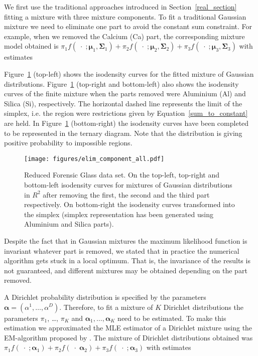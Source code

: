 \documentclass[12pt, a4paper]{article}
\newcommand{\m}[1]{\boldsymbol{#1}}
\theoremstyle{definition}
\begin{document}
We first use the traditional approaches introduced in Section~\ref{real_section} fitting a mixture with three mixture components. To fit a traditional Gaussian mixture we need to eliminate one part to avoid the constant sum constraint. For example, when we removed the Calcium (Ca) part, the corresponding mixture model obtained is
$
\pi_1 f(\;\cdot\; ; \m\mu_1, \m\Sigma_1) + \pi_2 f(\;\cdot\; ; \m\mu_2, \m\Sigma_2) + \pi_3 f(\;\cdot\; ; \m\mu_3, \m\Sigma_3)
$
with estimates

{\small  }


Figure~\ref{fig05component_elimination} (top-left) shows the isodensity curves for the fitted mixture of Gaussian distributions. Figure~\ref{fig05component_elimination} (top-right and bottom-left) also shows the isodensity curves of the finite mixture when the parts removed were Aluminium (Al) and Silica (Si), respectively. The horizontal dashed line represents the limit of the simplex, i.e. the region were restrictions given by Equation~\ref{sum_to_constant} are held. In Figure~\ref{fig05component_elimination} (bottom-right) the isodensity curves have been completed to be represented in the ternary diagram. Note that the distribution is giving positive probability to impossible regions. 

\begin{figure}[htbp]
\texttt{[image: figures/elim\_component\_all.pdf]}
\caption{Reduced Forensic Glass data set. On the top-left, top-right and bottom-left isodensity curves for mixtures of Gaussian distributions in $R^{2}$ after removing the first, the second and the third part respectively. On bottom-right the isodensity curves transformed into the simplex (simplex representation has been generated using Aluminium and Silica parts).}
\label{fig05component_elimination}
\end{figure}

Despite the fact that in Gaussian mixtures the maximum likelihood function is invariant whatever part is removed, we stated that in practice the numerical algorithm gets stuck in a local optimum. That is, the invariance of the results is not guaranteed, and different mixtures may be obtained depending on the part removed. 

A Dirichlet probability distribution is specified by the parameters $\m\alpha=\left( \alpha^1, \dots ,\alpha^D \right)$. Therefore, to fit a mixture of $K$ Dirichlet distributions the parameters $\pi_1$, \dots, $\pi_K$ and $\m\alpha_1, \dots, \m\alpha_K$ need to be estimated. To make this estimation we approximated the MLE estimator of a Dirichlet mixture using the EM-algorithm proposed by \cite{celeux1992classification}. The mixture of Dirichlet distributions obtained was $
\pi_1 f(\;\cdot\; ; \m\alpha_1) + \pi_2 f(\;\cdot\; \m\alpha_2) + \pi_3 f(\;\cdot\; ; \m\alpha_3)
$
 with estimates
{\small  }
\end{document}
